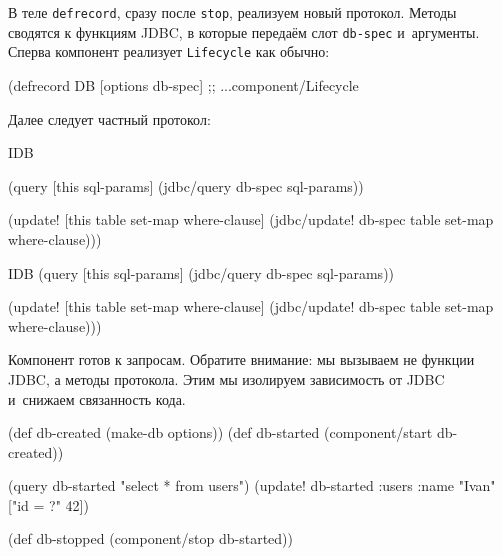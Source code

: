 \fi

В теле \verb|defrecord|, сразу после \verb|stop|, реализуем новый
протокол. Методы сводятся к функциям JDBC, в которые передаём слот
\verb|db-spec| и~аргументы. Сперва компонент реализует \verb|Lifecycle| как
обычно:

\begin{english}
  \begin{clojure}
(defrecord DB [options db-spec]
  ;; ...component/Lifecycle
  \end{clojure}
\end{english}

\noindent
Далее следует частный протокол:

\ifnarrow

\begin{english}
  \begin{clojure}
  IDB

  (query [this sql-params]
    (jdbc/query db-spec sql-params))

  (update!
    [this table set-map where-clause]
    (jdbc/update! db-spec
      table set-map where-clause)))
  \end{clojure}
\end{english}

\else

\begin{english}
  \begin{clojure}
  IDB
  (query [this sql-params]
    (jdbc/query db-spec sql-params))

  (update! [this table set-map where-clause]
    (jdbc/update! db-spec table set-map where-clause)))
  \end{clojure}
\end{english}

\fi

Компонент готов к запросам. Обратите внимание: мы вызываем не функции JDBC, а
методы протокола. Этим мы изолируем зависимость от JDBC и~снижаем связанность
кода.

\ifnarrow

\begin{english}
  \begin{clojure}
(def db-created (make-db options))
(def db-started
  (component/start db-created))

(query db-started "select * from users")
(update! db-started
  :users {:name "Ivan"} ["id = ?" 42])

(def db-stopped
  (component/stop db-started))
  \end{clojure}
\end{english}

